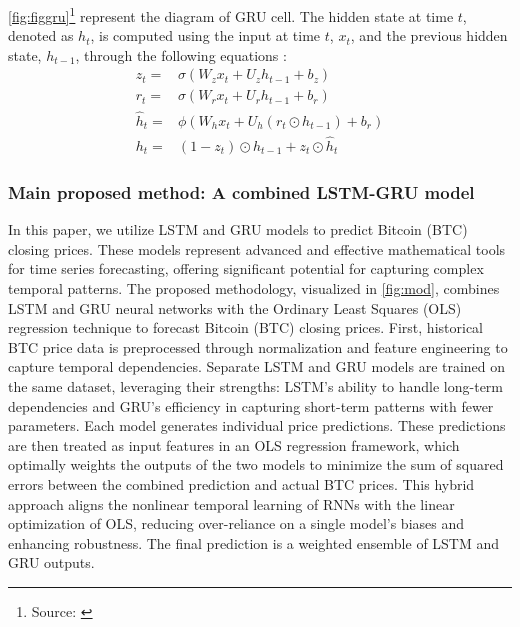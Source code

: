 \documentclass[]{interact}
\theoremstyle{plain}%
\theoremstyle{definition}
\theoremstyle{remark}
\begin{document}
\autoref{fig:figgru}\footnote{Source: \citep{vasilev2019}} represent the
diagram of GRU cell. The hidden state at time \(t\), denoted as \(h_t\),
is computed using the input at time \(t\), \(x_t\), and the previous
hidden state, \(h_{t-1}\), through the following equations
\citep{dey2017}: \begin{align}
z_t= & \sigma\left(W_z x_t+U_z h_{t-1}+b_z \right)\\
r_t= & \sigma\left(W_r x_t+U_rh_{t-1}+b_r \right)\\
\widehat{h}_t= & \phi\left(W_hx_t+U_h(r_t \odot h_{t-1})+b_r \right)\\
h_t= & (1-z_t)\odot h_{t-1}+z_t \odot \widehat{h}_{t}
\end{align}

\subsubsection{Main proposed method: A combined LSTM-GRU
model}\label{main-proposed-method-a-combined-lstm-gru-model}

In this paper, we utilize LSTM and GRU models to predict Bitcoin (BTC)
closing prices. These models represent advanced and effective
mathematical tools for time series forecasting, offering significant
potential for capturing complex temporal patterns. The proposed
methodology, visualized in \autoref{fig:mod}, combines LSTM and GRU
neural networks with the Ordinary Least Squares (OLS) regression
technique to forecast Bitcoin (BTC) closing prices. First, historical
BTC price data is preprocessed through normalization and feature
engineering to capture temporal dependencies. Separate LSTM and GRU
models are trained on the same dataset, leveraging their strengths:
LSTM's ability to handle long-term dependencies and GRU's efficiency in
capturing short-term patterns with fewer parameters. Each model
generates individual price predictions. These predictions are then
treated as input features in an OLS regression framework, which
optimally weights the outputs of the two models to minimize the sum of
squared errors between the combined prediction and actual BTC prices.
This hybrid approach aligns the nonlinear temporal learning of RNNs with
the linear optimization of OLS, reducing over-reliance on a single
model's biases and enhancing robustness. The final prediction is a
weighted ensemble of LSTM and GRU outputs.
\end{document}
